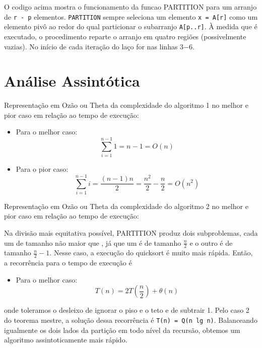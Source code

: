 \documentclass{article}
\begin{document}
O codigo acima mostra o funcionamento da funcao PARTITION para um arranjo de \texttt{r - p} elementos. \texttt{PARTITION} sempre seleciona um elemento \texttt{x = A[r]} como um elemento pivô ao redor do qual particionar o subarranjo \texttt{A[p..r]}. À medida que é executado, o procedimento reparte o arranjo em quatro regiões (possivelmente vazias). No início de cada iteração do laço for nas linhas 3−6.

\section{Análise Assintótica}

Representação em Ozão ou Theta da complexidade do algoritmo 1 no melhor e pior caso em relação ao tempo de execução:
\begin{itemize}
  \item{Para o melhor caso:}
    \begin{equation}
        \sum_{i=1}^{n-1}1= n - 1 = O(n)
    \end{equation}
  \item{Para o pior caso:}
    \begin{equation}
        \sum_{i=1}^{n-1}i= \frac{(n-1)n}{2} = \frac{n^{2}}{2} - \frac{n}{2}= O(n^{2})
    \end{equation}
\end{itemize}

Representação em Ozão ou Theta da complexidade do algoritmo 2 no melhor e pior caso em relação ao tempo de execução:

Na divisão mais equitativa possível, PARTITION produz dois subproblemas, cada um de tamanho não maior que , já que um é de tamanho $\frac{n}{2}$ e o outro é de tamanho $\frac{n}{2} − 1$. Nesse caso, a execução do quicksort é muito mais rápida. Então, a recorrência para o tempo de execução é
\begin{itemize}
  \item{Para o melhor caso:}
    \begin{equation}
       T(n) = 2T(\frac{n}{2}) + \theta (n)
      \end{equation}
\end{itemize}
onde toleramos o desleixo de ignorar o piso e o teto e de subtrair 1. Pelo caso 2 do teorema mestre, a solução dessa recorrência é \texttt{T(n) = Q(n lg n)}. Balanceando igualmente os dois lados da partição em todo nível da recursão, obtemos um algoritmo assintoticamente mais rápido.
\end{document}
